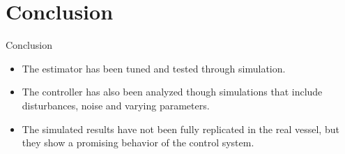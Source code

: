 \section{Conclusion}

\begin{frame}{Conclusion}{}
    \begin{itemize}
        \item The estimator has been tuned and tested through simulation.
    \end{itemize}
    \begin{itemize}
        \item The controller has also been analyzed though simulations that include disturbances, noise and varying parameters.
    \end{itemize}
    \begin{itemize}
        \item The simulated results have not been fully replicated in the real vessel, but they show a promising behavior of the control system.
    \end{itemize}
\end{frame}